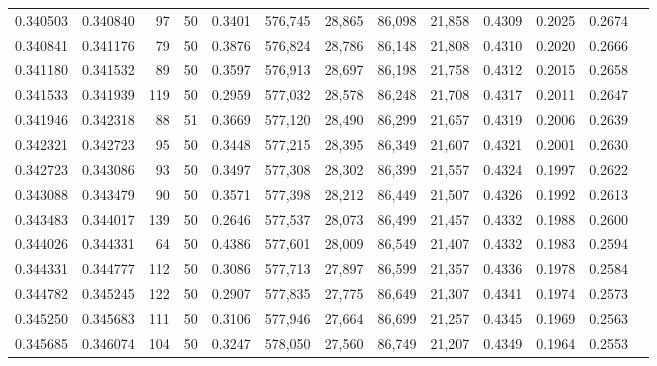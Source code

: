 \begin{tabular}{rrrrrrrrrrrrr}
0.340503 & 0.340840 &    97 &  50 &                                     0.3401 & 576,745 &  28,865 &  86,098 &  21,858 & 0.4309 & 0.2025 & 0.2674 \\
0.340841 & 0.341176 &    79 &  50 &                                     0.3876 & 576,824 &  28,786 &  86,148 &  21,808 & 0.4310 & 0.2020 & 0.2666 \\
0.341180 & 0.341532 &    89 &  50 &                                     0.3597 & 576,913 &  28,697 &  86,198 &  21,758 & 0.4312 & 0.2015 & 0.2658 \\
0.341533 & 0.341939 &   119 &  50 &                                     0.2959 & 577,032 &  28,578 &  86,248 &  21,708 & 0.4317 & 0.2011 & 0.2647 \\
0.341946 & 0.342318 &    88 &  51 &                                     0.3669 & 577,120 &  28,490 &  86,299 &  21,657 & 0.4319 & 0.2006 & 0.2639 \\
0.342321 & 0.342723 &    95 &  50 &                                     0.3448 & 577,215 &  28,395 &  86,349 &  21,607 & 0.4321 & 0.2001 & 0.2630 \\
0.342723 & 0.343086 &    93 &  50 &                                     0.3497 & 577,308 &  28,302 &  86,399 &  21,557 & 0.4324 & 0.1997 & 0.2622 \\
0.343088 & 0.343479 &    90 &  50 &                                     0.3571 & 577,398 &  28,212 &  86,449 &  21,507 & 0.4326 & 0.1992 & 0.2613 \\
0.343483 & 0.344017 &   139 &  50 &                                     0.2646 & 577,537 &  28,073 &  86,499 &  21,457 & 0.4332 & 0.1988 & 0.2600 \\
0.344026 & 0.344331 &    64 &  50 &                                     0.4386 & 577,601 &  28,009 &  86,549 &  21,407 & 0.4332 & 0.1983 & 0.2594 \\
0.344331 & 0.344777 &   112 &  50 &                                     0.3086 & 577,713 &  27,897 &  86,599 &  21,357 & 0.4336 & 0.1978 & 0.2584 \\
0.344782 & 0.345245 &   122 &  50 &                                     0.2907 & 577,835 &  27,775 &  86,649 &  21,307 & 0.4341 & 0.1974 & 0.2573 \\
0.345250 & 0.345683 &   111 &  50 &                                     0.3106 & 577,946 &  27,664 &  86,699 &  21,257 & 0.4345 & 0.1969 & 0.2563 \\
0.345685 & 0.346074 &   104 &  50 &                                     0.3247 & 578,050 &  27,560 &  86,749 &  21,207 & 0.4349 & 0.1964 & 0.2553 \\

\end{tabular}
